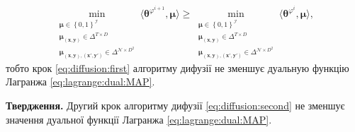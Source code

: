 \begin{equation*}
    \min \limits_{\substack{\pmb{\mu} \in \left\{ 0, 1 \right\}^{\mathcal{I}} \\
                            \pmb{\mu_{\left(x, y \right)}} \in \Delta^{T \times D} \\
                            \pmb{\mu_{\left(x, y \right), \left(x', y' \right)}} \in
                                \Delta^{\mathcal{N} \times D^2}}}
        \langle \pmb{\theta}^{\varphi^{i + 1}}, \pmb{\mu} \rangle \ge
    \min \limits_{\substack{\pmb{\mu} \in \left\{ 0, 1 \right\}^{\mathcal{I}} \\
                            \pmb{\mu_{\left(x, y \right)}} \in \Delta^{T \times D} \\
                            \pmb{\mu_{\left(x, y \right), \left(x', y' \right)}} \in
                                \Delta^{\mathcal{N} \times D^2}}}
        \langle \pmb{\theta}^{\varphi^i}, \pmb{\mu} \rangle,
\end{equation*}
тобто крок \eqref{eq:diffusion:first}
алгоритму дифузії не зменшує дуальную функцію Лагранжа \eqref{eq:lagrange:dual:MAP}.

\textbf{Твердження.}
Другий крок алгоритму дифузії \eqref{eq:diffusion:second}
не зменшує значення дуальної функції Лагранжа \eqref{eq:lagrange:dual:MAP}.

